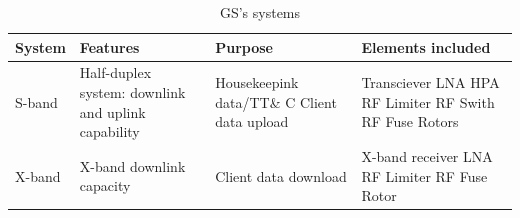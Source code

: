 \begin{table}[H]
\begin{center}
\begin{tabular}{|p{4cm}|p{4cm}|p{4cm}|p{4cm}|}
\hline
\rowcolor{blue} \textbf{System}&\textbf{Features}&\textbf{Purpose}&\textbf{Elements included}\\
\hline
S-band&Half-duplex system: downlink and uplink capability&Housekeepink data/TT\& C \newline
Client data upload&
Transciever 
\newline
LNA
\newline
HPA
\newline
RF Limiter
\newline
RF Swith
\newline
RF Fuse
\newline
Rotors\\
\hline
X-band&X-band downlink capacity&Client data download&X-band receiver
\newline
LNA
\newline
RF Limiter
\newline
RF Fuse
\newline
Rotor\\
\hline
\end{tabular}
\caption{GS's systems}
\end{center}
\end{table}